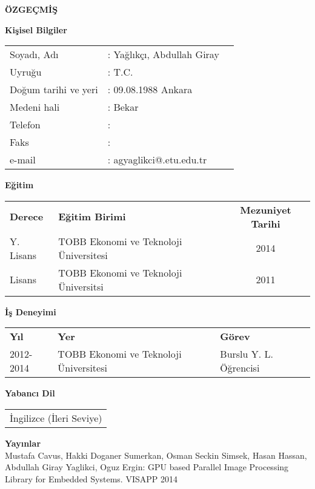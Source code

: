 \newpage
\pagestyle{plain}
\begin{center}
{\LARGE \bf \"OZGE\c{C}M\.{I}\c{S}}
\end{center}
\vspace{0.5cm}
{\bf Ki\c{s}isel Bilgiler}


\noindent
\begin{tabular}{@{}lll@{}}
Soyad{\i}, Ad{\i} & : Yağlıkçı, Abdullah Giray &\\
Uyru\u{g}u & : T.C.&\\
Do\u{g}um tarihi ve yeri & : 09.08.1988 Ankara&\\
Medeni hali & : Bekar& \\
Telefon & : &\\
Faks & : &\\
e-mail & : agyaglikci@.etu.edu.tr &\\
\end{tabular}

\vspace{0.5cm}
\noindent
{\bf E\u{g}itim}


\noindent
\begin{tabular}{@{}llc@{}}
{\bf Derece} & {\bf E\u{g}itim Birimi} & {\bf Mezuniyet Tarihi}\\
Y. Lisans & TOBB Ekonomi ve Teknoloji \"Universitesi & 2014\\
Lisans & TOBB Ekonomi ve Teknoloji \"Universitsi& 2011\\
\end{tabular}

\vspace{0.5cm}
\noindent
{\bf \.{I}\c{s} Deneyimi}


\noindent
\begin{tabular}{@{}lll@{}}
{\bf Y{\i}l} & {\bf Yer} & {\bf G\"orev}\\
2012-2014 & TOBB Ekonomi ve Teknoloji \"Universitesi & Burslu Y. L. Öğrencisi\\
\end{tabular}

\vspace{0.5cm}
\noindent
{\bf Yabanc{\i} Dil}


\noindent
\begin{tabular}{@{}l@{}}
\.{I}ngilizce (İleri Seviye)\\
\end{tabular}


\vspace{0.5cm}
\noindent
{\bf Yay{\i}nlar} \\
\noindent
Mustafa Cavus, Hakki Doganer Sumerkan, Osman Seckin Simsek, Hasan Hassan, Abdullah Giray Yaglikci, Oguz Ergin: GPU based Parallel Image Processing Library for Embedded Systems. VISAPP 2014
